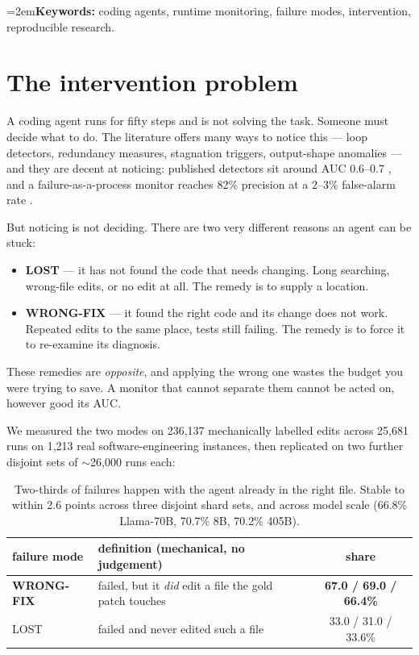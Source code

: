 \documentclass[10pt]{article}
\begin{document}
\vspace{-0.3em}
\noindent\hangindent=2em\textbf{Keywords:} coding agents, runtime monitoring, failure modes,
intervention, reproducible research.

\newpage
\tableofcontents
\newpage

\section{The intervention problem}

A coding agent runs for fifty steps and is not solving the task. Someone must decide what to do. The
literature offers many ways to notice this --- loop detectors, redundancy measures, stagnation
triggers, output-shape anomalies --- and they are decent at noticing: published detectors sit around
AUC 0.6--0.7 \cite{agentstop}, and a failure-as-a-process monitor reaches 82\% precision at a
2--3\% false-alarm rate \cite{fap}.

But noticing is not deciding. There are two very different reasons an agent can be stuck:

\begin{itemize}[leftmargin=1.3em,itemsep=1pt]
\item \textbf{LOST} --- it has not found the code that needs changing. Long searching, wrong-file
  edits, or no edit at all. The remedy is to supply a location.
\item \textbf{WRONG-FIX} --- it found the right code and its change does not work. Repeated edits to
  the same place, tests still failing. The remedy is to force it to re-examine its diagnosis.
\end{itemize}

\noindent These remedies are \emph{opposite}, and applying the wrong one wastes the budget you were
trying to save. A monitor that cannot separate them cannot be acted on, however good its AUC.

We measured the two modes on 236{,}137 mechanically labelled edits across 25{,}681 runs on
1{,}213 real software-engineering instances, then replicated on two further disjoint sets of
$\sim$26{,}000 runs each:

\begin{table}[h]
\centering\small
\begin{tabular}{llc}
\toprule
failure mode & definition (mechanical, no judgement) & share \\
\midrule
\textbf{WRONG-FIX} & failed, but it \emph{did} edit a file the gold patch touches & \textbf{67.0 / 69.0 / 66.4\%} \\
LOST & failed and never edited such a file & 33.0 / 31.0 / 33.6\% \\
\bottomrule
\end{tabular}
\caption{Two-thirds of failures happen with the agent already in the right file. Stable to within
2.6 points across three disjoint shard sets, and across model scale (66.8\% Llama-70B, 70.7\% 8B,
70.2\% 405B).}
\end{table}
\end{document}
